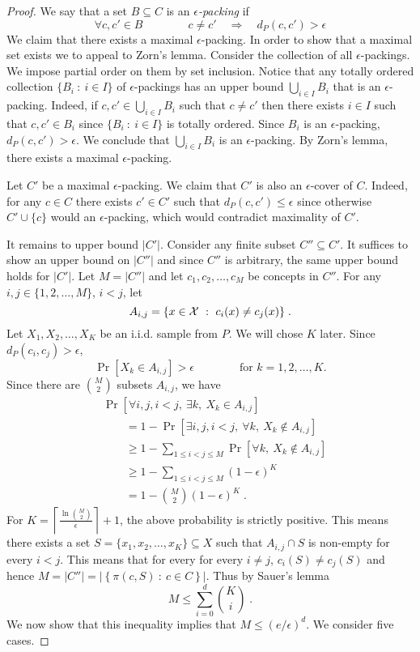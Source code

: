 \begin{proof}
We say that a set $B \subseteq C$ is an \emph{$\epsilon$-packing} if
$$
\forall c,c' \in B \qquad \qquad c \neq c' \quad \Longrightarrow \quad d_P(c,c') > \epsilon
$$
We claim that there exists a maximal $\epsilon$-packing. In order to show that a
maximal set exists we to appeal to Zorn's lemma. Consider the collection of all
$\epsilon$-packings. We impose partial order on them by set inclusion. Notice
that any totally ordered collection $\{ B_i ~:~ i \in I \}$ of
$\epsilon$-packings has an upper bound $\bigcup_{i \in I} B_i$ that is an
$\epsilon$-packing. Indeed, if $c,c' \in \bigcup_{i \in I} B_i$ such that $c
\neq c'$ then there exists $i \in I$ such that $c,c' \in B_i$ since $\{ B_i ~:~
i \in I \}$ is totally ordered. Since $B_i$ is an $\epsilon$-packing, $d_P(c,c') >
\epsilon$. We conclude that $\bigcup_{i \in I} B_i$ is an $\epsilon$-packing. By
Zorn's lemma, there exists a maximal $\epsilon$-packing.

Let $C'$ be a maximal $\epsilon$-packing. We claim that $C'$ is also an
$\epsilon$-cover of $C$. Indeed, for any $c \in C$ there exists $c' \in C'$ such
that $d_P(c,c') \le \epsilon$ since otherwise $C' \cup \{c\}$ would an
$\epsilon$-packing, which would contradict maximality of $C'$.

It remains to upper bound $|C'|$. Consider any finite subset $C'' \subseteq C'$.
It suffices to show an upper bound on $|C''|$ and since $C''$ is arbitrary, the
same upper bound holds for $|C'|$. Let $M = |C''|$ and let $c_1, c_2, \dots,
c_M$ be concepts in $C''$. For any $i,j \in \{1,2,\dots,M\}$, $i < j$, let
$$
A_{i,j} = \{ x \in \mathcal{X} ~:~ c_i(x) \neq c_j(x) \} \; .
$$
Let $X_1, X_2, \dots, X_K$ be an i.i.d. sample from $P$. We will chose $K$ later.
Since $d_P(c_i, c_j) > \epsilon$,
$$
\Pr[X_k \in A_{i,j}] > \epsilon \qquad \qquad \text{for $k=1,2,\dots,K$}.
$$
Since there are $\binom{M}{2}$ subsets $A_{i,j}$, we have
\begin{align*}
& \Pr\left[\forall i,j, i < j, \ \exists k, \ X_k \in A_{i,j} \right] \\
& \qquad = 1 - \Pr\left[\exists i,j, i < j, \ \forall k, \ X_k \not \in A_{i,j} \right] \\
& \qquad \ge 1 - \sum_{1 \le i < j \le M} \Pr\left[\forall k, \ X_k \not \in A_{i,j} \right] \\
& \qquad \ge 1 - \sum_{1 \le i < j \le M} (1 - \epsilon)^K \\
& \qquad = 1 - \binom{M}{2} (1 - \epsilon)^K \; .
\end{align*}
For $K = \left\lceil \frac{\ln \binom{M}{2}}{\epsilon} \right\rceil +
1$, the above probability is strictly positive. This means there exists a set $S =
\{x_1, x_2, \dots, x_K\} \subseteq X$ such that $A_{i,j} \cap S$ is non-empty
for every $i < j$. This means that for every for every $i \neq j$, $c_i(S) \neq
c_j(S)$ and hence $M = |C''| = \left| \left\{ \pi(c, S) ~:~ c \in C \right\} \right|$.
Thus by Sauer's lemma
$$
M \le \sum_{i=0}^d \binom{K}{i} \; .
$$
We now show that this inequality implies that $M \le (e/\epsilon)^d$. We consider five cases.


\end{proof}
